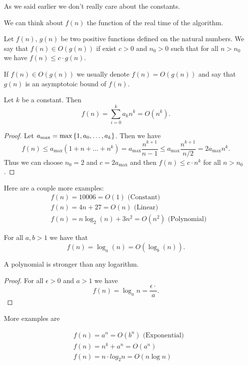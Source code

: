 \documentclass[11pt,a4paper]{article}
\begin{document}
As we said earlier we don't really care about the constants.

We can think about $f(n)$ the function of the real time of the algorithm.

\begin{definition}
    Let $f(n)$, $g(n)$ be two positive functions defined on the natural
    numbers.
    We say that $f(n) \in O(g(n))$ if exist $c > 0$ and $n_0 > 0$ such
    that for all $n > n_0$ we have $f(n) \le c \cdot g(n)$.
\end{definition}

If $f(n) \in O(g(n))$ we usually denote $f(n) = O(g(n))$ and say that
$g(n)$ is an asymptotoic bound of $f(n)$.

\begin{proposition}
    Let $k$ be a constant. Then
    \[
        f(n) = \sum_{i=0}^{k} a_k n^k = O(n^k).
    \]
\end{proposition}
\begin{proof}
    Let $a_{\max} = \max\set{1,a_0,\dots,a_k}$.
    Then we have
    \[
        f(n) \le a_{\max}(1 + n + \dots + n^k) =
        a_{\max} \frac{n^{k+1}}{n-1} \le
        a_{\max} \frac{n^{k+1}}{n/2} = 2 a_\max n^k.
    \]
    Thus we can choose $n_0 = 2$ and $c = 2 a_\max$ and then
    $f(n) \le c \cdot n^k$ for all $n > n_0$.
\end{proof}

Here are a couple more examples:
\begin{align*}
    &f(n) = 10006 = O(1) \text{ (Constant)} \\
    &f(n) = 4n + 27 =O(n) \text{ (Linear)} \\
    &f(n) = n \log_2(n) + 3n^2 = O(n^2) \text{ (Polynomial)}
\end{align*}

\begin{proposition}
    For all $a,b > 1$ we have that
    \[
        f(n) = \log_a(n) = O(\log_b(n)).
    \]
\end{proposition}

A polynomial is stronger than any logarithm.

\begin{proof}
    For all $\epsilon > 0$ and $a > 1$ we have
    \[ f(n) = \log_a n = \frac{\epsilon \cdot}{a}. \]
\end{proof}

More examples are

\begin{align*}
    &f(n) = a^n = O(b^n) \text{ (Exponential)} \\
    &f(n) = n^k + a^n = O(a^n) \\
    &f(n) = n \cdot log_2 n = O(n \log n)
\end{align*}
\end{document}
